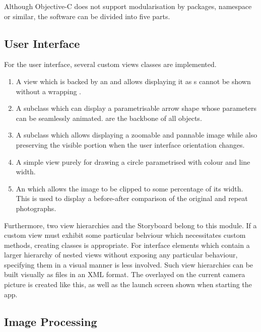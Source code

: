 Although Objective-C does not support modularisation by packages, namespace or
similar, the software can be divided into five parts.

\subsection{User Interface}

For the user interface, several custom views classes are implemented.
\begin{enumerate}
   \item {} A view which is backed by an  and
      allows displaying it as s cannot be shown without a
      wrapping .
   \item {} A  subclass which can display a
      parametrisable arrow shape whose parameters can be seamlessly animated.
       are the backbone of all  objects.
   \item {} A  subclass which allows
      displaying a zoomable and pannable image while also preserving the visible
      portion when the user interface orientation changes.
   \item {} A simple view purely for drawing a circle parametrised
      with colour and line width.
   \item {} An  which allows the
      image to be clipped to some percentage of its width. This is used to
      display a before-after comparison of the original and repeat photographs.
\end{enumerate}

Furthermore, two view hierarchies and the Storyboard belong to this module.  If
a custom view must exhibit some particular behviour which necessitates custom
methods, creating classes is appropriate. For interface elements which contain a
larger hierarchy of nested views without exposing any particular behaviour,
specifying them in a visual manner is less involved. Such view hierarchies can
be built visually as  files in an XML format. The
 overlayed on the current camera picture is created like
this, as well as the launch screen shown when starting the app.


\subsection{Image Processing}

